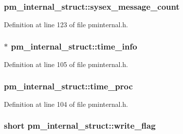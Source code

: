 \subsubsection[{\texorpdfstring{sysex\+\_\+message\+\_\+count}{sysex_message_count}}]{ pm\+\_\+internal\+\_\+struct\+::sysex\+\_\+message\+\_\+count}\hypertarget{structpm__internal__struct_ac0a1f6b21c5a1a69e5d913d804387ff0}{}\label{structpm__internal__struct_ac0a1f6b21c5a1a69e5d913d804387ff0}


Definition at line 123 of file pminternal.\+h.

\subsubsection[{\texorpdfstring{time\+\_\+info}{time_info}}]{$\ast$ pm\+\_\+internal\+\_\+struct\+::time\+\_\+info}\hypertarget{structpm__internal__struct_ac3ee4fe374d89f3040708206648acb07}{}\label{structpm__internal__struct_ac3ee4fe374d89f3040708206648acb07}


Definition at line 105 of file pminternal.\+h.

\subsubsection[{\texorpdfstring{time\+\_\+proc}{time_proc}}]{ pm\+\_\+internal\+\_\+struct\+::time\+\_\+proc}\hypertarget{structpm__internal__struct_aa2268f6b4916d4ae3de765d880bc8641}{}\label{structpm__internal__struct_aa2268f6b4916d4ae3de765d880bc8641}


Definition at line 104 of file pminternal.\+h.

\subsubsection[{\texorpdfstring{write\+\_\+flag}{write_flag}}]{\setlength{\rightskip}{0pt plus 5cm}short pm\+\_\+internal\+\_\+struct\+::write\+\_\+flag}\hypertarget{structpm__internal__struct_abea16d3f5e2dc3d0a9e1e7d02ea45be5}{}\label{structpm__internal__struct_abea16d3f5e2dc3d0a9e1e7d02ea45be5}


